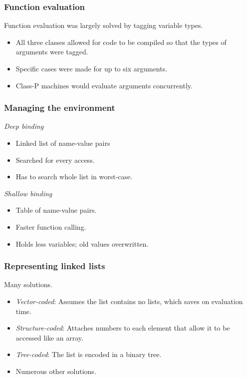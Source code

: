 \documentclass{beamer}
\begin{document}
\begin{frame}
	\frametitle{Function evaluation}
	Function evaluation was largely solved by tagging variable types.
	\newline
	\begin{itemize}
		\item All three classes allowed for code to be compiled so that the types of arguments were tagged.
		\newline
		\item Specific cases were made for up to six arguments.
		\newline
		\item Class-P machines would evaluate arguments concurrently.
	\end{itemize}
\end{frame}

\begin{frame}
	\frametitle{Managing the environment}
	\emph{Deep binding}
	\begin{itemize}
		\item Linked list of name-value pairs
		\item Searched for every access.
		\item Has to search whole list in worst-case. \newline
	\end{itemize}
	\emph{Shallow binding}
	\begin{itemize}
		\item Table of name-value pairs.
		\item Faster function calling.
		\item Holds less variables; old values overwritten.
	\end{itemize}
\end{frame}

\begin{frame}
	\frametitle{Representing linked lists}
	Many solutions.
	\newline
	\begin{itemize}
		\item \emph{Vector-coded}: Assumes the list contains no lists, which saves on evaluation time.
		\item \emph{Structure-coded}: Attaches numbers to each element that allow it to be accessed like an array.
		\item \emph{Tree-coded}: The list is encoded in a binary tree.
		\item Numerous other solutions.
	\end{itemize}
\end{frame}
\end{document}
